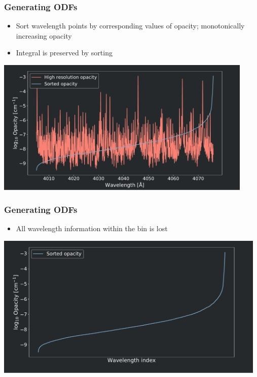 \frame
{
	\frametitle{Generating ODFs}
	\begin{itemize}
    \item Sort wavelength points by corresponding values of opacity; monotonically increasing opacity
    \item Integral is preserved by sorting
	\end{itemize}		
	\centering
	\includegraphics[width=123mm]{images/odf_generation_process_1}
}

\frame
{
	\frametitle{Generating ODFs}
	\begin{itemize}
		\item All wavelength information within the bin is lost
\end{itemize}		

		\centering
	\includegraphics[width=130mm]{images/odf_generation_process_2}
}

